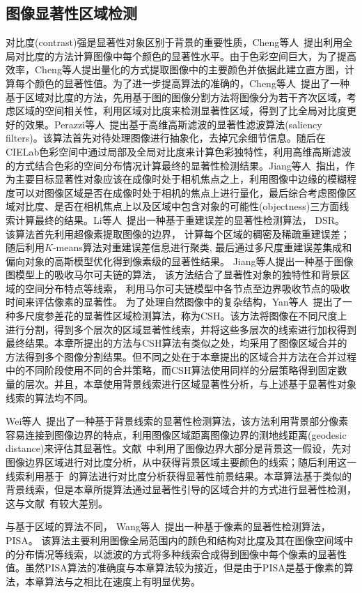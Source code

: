 \subsection{图像显著性区域检测}
\label{sec:SaliencyDetection}
对比度(contrast)强是显著性对象区别于背景的重要性质，Cheng等人~\cite{ChengPAMI}提出利用全局对比度的方法计算图像中每个颜色的显著性水平。由于色彩空间巨大，为了提高效率，Cheng等人提出量化的方式提取图像中的主要颜色并依据此建立直方图，计算每个颜色的显著性值。为了进一步提高算法的准确的，Cheng等人~\cite{ChengPAMI}提出了一种基于区域对比度的方法，先用基于图的图像分割方法将图像分为若干齐次区域，考虑区域的空间相关性，利用区域对比度来检测显著性区域，得到了比全局对比度更好的效果。Perazzi等人~\cite{saliencyFilter}提出基于高维高斯滤波的显著性滤波算法(saliency filters)。该算法首先对待处理图像进行抽象化，去掉冗余细节信息。随后在CIELab色彩空间中通过局部及全局对比度来计算色彩独特性，利用高维高斯滤波的方式结合色彩的空间分布情况计算最终的显著性检测结果。Jiang等人~\cite{ufo}指出，作为主要目标显著性对象应该在成像时处于相机焦点之上，利用图像中边缘的模糊程度可以对图像区域是否在成像时处于相机的焦点上进行量化，最后综合考虑图像区域对比度、是否在相机焦点上以及区域中包含对象的可能性(objectness)三方面线索计算最终的结果。Li等人~\cite{DSR}提出一种基于重建误差的显著性检测算法， DSR。 该算法首先利用超像素提取图像的边界， 计算每个区域的稠密及稀疏重建误差； 随后利用$K$-means算法对重建误差信息进行聚类, 最后通过多尺度重建误差集成和偏向对象的高斯模型优化得到像素级的显著性结果。 Jiang等人\cite{MC}提出一种基于图像图模型上的吸收马尔可夫链的算法， 该方法结合了显著性对象的独特性和背景区域的空间分布特点等线索， 利用马尔可夫链模型中各节点至边界吸收节点的吸收时间来评估像素的显著性。 为了处理自然图像中的复杂结构，Yan等人~\cite{ECSSD}提出了一种多尺度参差花的显著性区域检测算法，称为CSH。该方法将图像在不同尺度上进行分割，得到多个层次的区域显著性线索，并将这些多层次的线索进行加权得到最终结果。本章所提出的方法与CSH算法有类似之处，均采用了图像区域合并的方法得到多个图像分割结果。但不同之处在于本章提出的区域合并方法在合并过程中的不同阶段使用不同的合并策略，而CSH算法使用同样的分层策略得到固定数量的层次。并且，本章使用背景线索进行区域显著性分析，与上述基于显著性对象线索的算法均不同。\par
Wei等人~\cite{geodesicDistance}提出了一种基于背景线索的显著性检测算法，该方法利用背景部分像素容易连接到图像边界的特点，利用图像区域距离图像边界的测地线距离(geodesic distance)来评估其显著性。文献~中利用了图像边界大部分是背景这一假设，先对图像边界区域进行对比度分析，从中获得背景区域主要颜色的线索；随后利用这一线索利用基于~的算法进行对比度分析获得显著性前景结果。本章算法基于类似的背景线索，但是本章所提算法通过显著性引导的区域合并的方式进行显著性检测，这与文献~有较大差别。\par
与基于区域的算法不同， Wang等人~\cite{PISA}提出一种基于像素的显著性检测算法， PISA。 该算法主要利用图像全局范围内的颜色和结构对比度及其在图像空间域中的分布情况等线索，以滤波的方式将多种线索合成得到图像中每个像素的显著性值。虽然PISA算法的准确度与本章算法较为接近，但是由于PISA是基于像素的算法，本章算法与之相比在速度上有明显优势。

